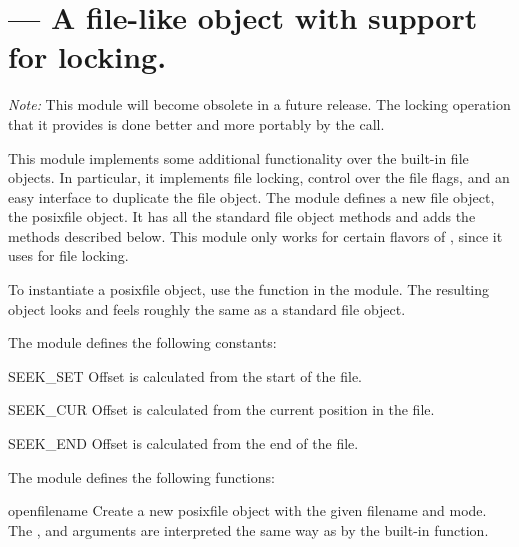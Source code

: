 \section{ ---
         A file-like object with support for locking.}



\emph{Note:} This module will become obsolete in a future release.
The locking operation that it provides is done better and more
portably by the  call.%

This module implements some additional functionality over the built-in
file objects.  In particular, it implements file locking, control over
the file flags, and an easy interface to duplicate the file object.
The module defines a new file object, the posixfile object.  It
has all the standard file object methods and adds the methods
described below.  This module only works for certain flavors of
\UNIX{}, since it uses  for file locking.%

To instantiate a posixfile object, use the  function
in the  module.  The resulting object looks and
feels roughly the same as a standard file object.

The  module defines the following constants:


\begin{datadesc}{SEEK_SET}
Offset is calculated from the start of the file.
\end{datadesc}

\begin{datadesc}{SEEK_CUR}
Offset is calculated from the current position in the file.
\end{datadesc}

\begin{datadesc}{SEEK_END}
Offset is calculated from the end of the file.
\end{datadesc}

The  module defines the following functions:


\begin{funcdesc}{open}{filename}
 Create a new posixfile object with the given filename and mode.  The
 ,  and  arguments are
 interpreted the same way as by the built-in 
 function.
\end{funcdesc}

